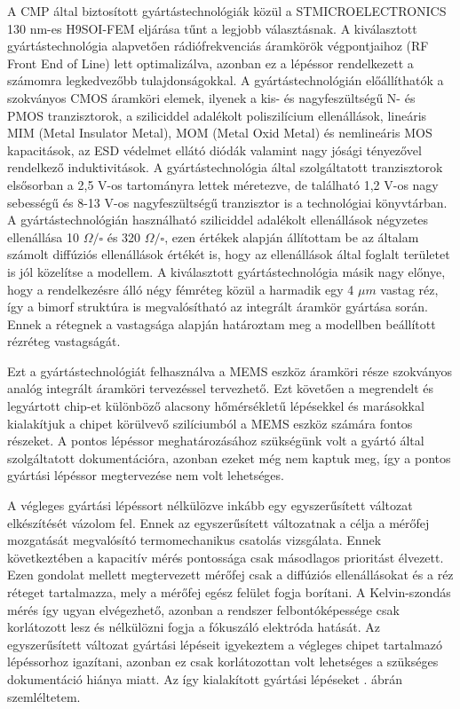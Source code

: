 A CMP által biztosított gyártástechnológiák közül a STMICROELECTRONICS 130 nm-es H9SOI-FEM\cite{H9SOI-FEM} eljárása tűnt a legjobb választásnak. A kiválasztott gyártástechnológia alapvetően rádiófrekvenciás áramkörök végpontjaihoz (RF Front End of Line) lett optimalizálva, azonban ez a lépéssor rendelkezett a számomra legkedvezőbb tulajdonságokkal. A gyártástechnológián előállíthatók a szokványos CMOS áramköri elemek, ilyenek a kis- és nagyfeszültségű N- és PMOS tranzisztorok, a sziliciddel adalékolt poliszilícium ellenállások, lineáris MIM (Metal Insulator Metal), MOM (Metal Oxid Metal) és nemlineáris MOS kapacitások, az ESD védelmet ellátó diódák valamint nagy jósági tényezővel rendelkező induktivitások. A gyártástechnológia által szolgáltatott tranzisztorok elsősorban a 2,5 V-os tartományra lettek méretezve, de található 1,2 V-os nagy sebességű és 8-13 V-os nagyfeszültségű tranzisztor is a technológiai könyvtárban. A gyártástechnológián használható sziliciddel adalékolt ellenállások négyzetes ellenállása 10 $\Omega / \square$ és 320 $\Omega / \square$, ezen értékek alapján állítottam be az általam számolt diffúziós ellenállások értékét is, hogy az ellenállások által foglalt területet is jól közelítse a modellem. A kiválasztott gyártástechnológia másik nagy előnye, hogy a rendelkezésre álló négy fémréteg közül a harmadik egy 4 $\mu m$ vastag réz, így a bimorf struktúra is megvalósítható az integrált áramkör gyártása során. Ennek a rétegnek a vastagsága alapján határoztam meg a modellben beállított rézréteg vastagságát.

Ezt a gyártástechnológiát felhasználva a MEMS eszköz áramköri része szokványos analóg integrált áramköri tervezéssel tervezhető. Ezt követően a megrendelt és legyártott chip-et különböző alacsony hőmérsékletű lépésekkel és marásokkal kialakítjuk a chipet körülvevő szilíciumból a MEMS eszköz számára fontos részeket. A pontos lépéssor meghatározásához szükségünk volt a gyártó által szolgáltatott dokumentációra, azonban ezeket még nem kaptuk meg, így a pontos gyártási lépéssor megtervezése nem volt lehetséges.

A végleges gyártási lépéssort nélkülözve inkább egy egyszerűsített változat elkészítését vázolom fel. Ennek az egyszerűsített változatnak a célja a mérőfej mozgatását megvalósító termomechanikus csatolás vizsgálata. Ennek következtében a kapacitív mérés pontossága csak másodlagos prioritást élvezett. Ezen gondolat mellett megtervezett mérőfej csak a diffúziós ellenállásokat és a réz réteget tartalmazza, mely a mérőfej egész felület fogja borítani. A Kelvin-szondás mérés így ugyan elvégezhető, azonban a rendszer felbontóképessége csak korlátozott lesz és nélkülözni fogja a fókuszáló elektróda hatását. Az egyszerűsített változat gyártási lépéseit igyekeztem a végleges chipet tartalmazó lépéssorhoz igazítani, azonban ez csak korlátozottan volt lehetséges a szükséges dokumentáció hiánya miatt. Az így kialakított gyártási lépéseket . ábrán szemléltetem.

